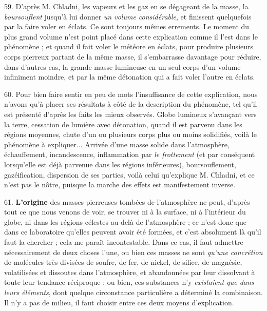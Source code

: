 \documentclass[a4paper, 11pt, oneside, polutonikogreek, french]{article}
\begin{document}
59. D'après M. Chladni, les vapeurs et les gaz en se dégageant de la masse, la \emph{boursouflent} jusqu'à lui donner \emph{un volume considérable}, et finissent quelquefois par la faire voler en éclats. Ce sont toujours mêmes errements. Le moment du plus grand volume n'est point placé dans cette explication comme il l'est dans le phénomène ; et quand il fait voler le météore en éclats, pour produire plusieurs corps pierreux partant de la même masse, il s'embarrasse davantage pour réduire, dans d'autres cas, la grande masse lumineuse en un seul corps d'un volume infiniment moindre, et par la même détonation qui a fait voler l'autre en éclats.

60. Pour bien faire sentir en peu de mots l'insuffisance de cette explication, nous n'avons qu'à placer ses résultats à côté de la description du phénomène, tel qu'il est présenté d'après les faits les mieux observés. \og Globe lumineux s'avançant vers la terre, cessation de lumière avec détonation, quand il est parvenu dans les régions moyennes, chute d'un ou plusieurs corps plus ou moins solidifiés, voilà le phénomène à expliquer... Arrivée d'une masse solide dans l'atmosphère, échauffement, incandescence, inflammation par \emph{le frottement} (et par conséquent lorsqu'elle est déjà parvenue dans les régions inférieures), boursouflement, gazéification, dispersion de ses parties, voilà celui qu'explique M. Chladni, et ce n'est pas le nôtre, puisque la marche des effets est manifestement inverse.

61. \textbf{L'origine} des masses pierreuses tombées de l'atmosphère ne peut, d'après tout ce que nous venons de voir, se trouver ni à la surface, ni à l'intérieur du globe, ni dans les régions célestes au-delà de l'atmosphère ; ce n'est donc que dans ce laboratoire qu'elles peuvent avoir été formées, et c'est absolument là qu'il faut la chercher ; cela me paraît incontestable. Dans ce cas, il faut admettre nécessairement de deux choses l'une, ou bien ces masses ne sont \emph{qu'une concrétion} de molécules très-divisées de soufre, de fer, de nickel, de silice, de magnésie, volatilisées et dissoutes dans l'atmosphère, et abandonnées par leur dissolvant à toute leur tendance réciproque ; ou bien, ces substances n'y \emph{existaient que dans leurs éléments}, dont quelque circonstance particulière a déterminé la combinaison. Il n'y a pas de milieu, il faut choisir entre ces deux moyens d'explication.
\end{document}
